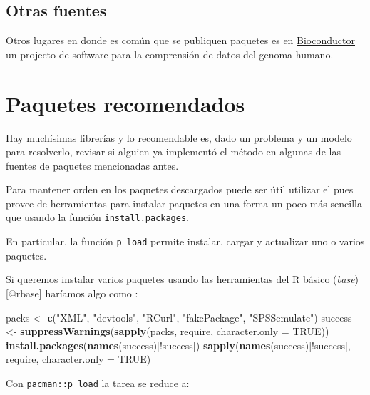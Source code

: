 \documentclass[]{article}
\newenvironment{Shaded}{\begin{snugshade}}{\end{snugshade}}
\newcommand{\KeywordTok}[1]{\textcolor[rgb]{0.13,0.29,0.53}{\textbf{{#1}}}}
\newcommand{\DataTypeTok}[1]{\textcolor[rgb]{0.13,0.29,0.53}{{#1}}}
\newcommand{\StringTok}[1]{\textcolor[rgb]{0.31,0.60,0.02}{{#1}}}
\newcommand{\OtherTok}[1]{\textcolor[rgb]{0.56,0.35,0.01}{{#1}}}
\newcommand{\NormalTok}[1]{{#1}}
\begin{document}
\subsection{Otras fuentes}\label{otras-fuentes}

Otros lugares en donde es común que se publiquen paquetes es en
\href{https://www.bioconductor.org/}{Bioconductor} un projecto de
software para la comprensión de datos del genoma humano.

\section{Paquetes recomendados}\label{paquetes-recomendados}

Hay muchísimas librerías y lo recomendable es, dado un problema y un
modelo para resolverlo, revisar si alguien ya implementó el método en
algunas de las fuentes de paquetes mencionadas antes.

Para mantener orden en los paquetes descargados puede ser útil utilizar
el \textcite{pacman} pues provee de herramientas para instalar paquetes
en una forma un poco más sencilla que usando la función
\texttt{install.packages}.

En particular, la función \texttt{p\_load} permite instalar, cargar y
actualizar uno o varios paquetes.

Si queremos instalar varios paquetes usando las herramientas del R
básico (\emph{base}) {[}@rbase{]} haríamos algo como
\parencite[ejemplo tomado de][en la viñeta de intrducción al paquete]{pacman}:

\begin{Shaded}
\begin{Highlighting}[]
\NormalTok{packs <-}\StringTok{ }\KeywordTok{c}\NormalTok{(}\StringTok{"XML"}\NormalTok{, }\StringTok{"devtools"}\NormalTok{, }\StringTok{"RCurl"}\NormalTok{, }\StringTok{"fakePackage"}\NormalTok{, }\StringTok{"SPSSemulate"}\NormalTok{)}
\NormalTok{success <-}\StringTok{ }\KeywordTok{suppressWarnings}\NormalTok{(}\KeywordTok{sapply}\NormalTok{(packs, require, }\DataTypeTok{character.only =} \OtherTok{TRUE}\NormalTok{))}
\KeywordTok{install.packages}\NormalTok{(}\KeywordTok{names}\NormalTok{(success)[!success])}
\KeywordTok{sapply}\NormalTok{(}\KeywordTok{names}\NormalTok{(success)[!success], require, }\DataTypeTok{character.only =} \OtherTok{TRUE}\NormalTok{)}
\end{Highlighting}
\end{Shaded}

Con \texttt{pacman::p\_load} la tarea se reduce a:
\end{document}
